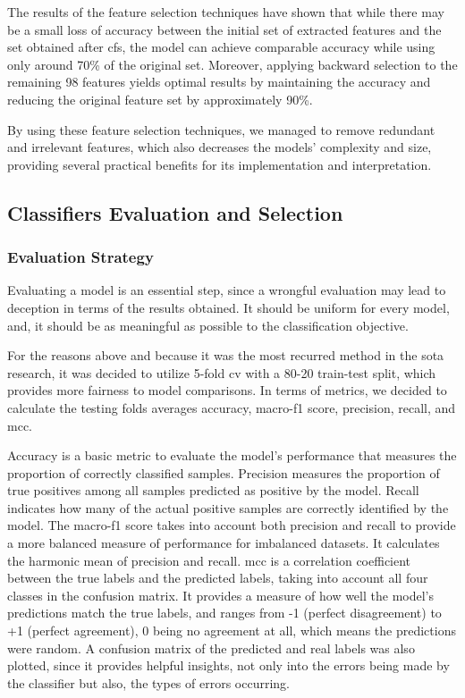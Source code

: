 The results of the feature selection techniques have shown that while there may be a small loss of accuracy between the initial set of extracted features and the set obtained after \ac{cfs}, the model can achieve comparable accuracy while using only around 70\% of the original set. Moreover, applying backward selection to the remaining 98 features yields optimal results by maintaining the accuracy and reducing the original feature set by approximately 90\%.

By using these feature selection techniques, we managed to remove redundant and irrelevant features, which also decreases the models' complexity and size, providing several practical benefits for its implementation and interpretation.


\subsection{Classifiers Evaluation and Selection}

\subsubsection{Evaluation Strategy}

Evaluating a model is an essential step, since a wrongful evaluation may lead to deception in terms of the results obtained. It should be uniform for every model, and, it should be as meaningful as possible to the classification objective.

For the reasons above and because it was the most recurred method in the \ac{sota} research, it was decided to utilize 5-fold \ac{cv} with a 80-20 train-test split, which provides more fairness to model comparisons. In terms of metrics, we decided to calculate the testing folds averages accuracy, macro-f1 score, precision, recall, and \ac{mcc}.

Accuracy is a basic metric to evaluate the model's performance that measures the proportion of correctly classified samples. Precision measures the proportion of true positives among all samples predicted as positive by the model. Recall indicates how many of the actual positive samples are correctly identified by the model. The macro-f1 score takes into account both precision and recall to provide a more balanced measure of performance for imbalanced datasets. It calculates the harmonic mean of precision and recall. \ac{mcc} is a correlation coefficient between the true labels and the predicted labels, taking into account all four classes in the confusion matrix. It provides a measure of how well the model's predictions match the true labels, and ranges from -1 (perfect disagreement) to +1 (perfect agreement), 0 being no agreement at all, which means the predictions were random. A confusion matrix of the predicted and real labels was also plotted, since it provides helpful insights, not only into the errors being made by the classifier but also, the types of errors occurring.

